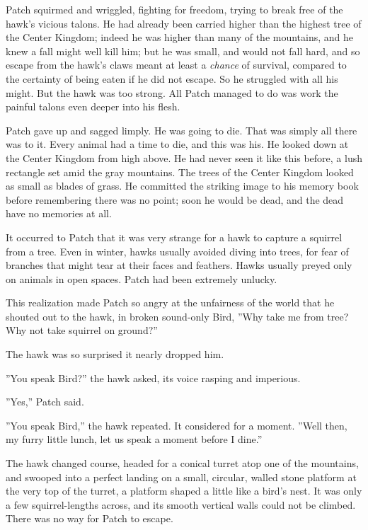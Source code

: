 \documentclass[12pt]{book}
\begin{document}
 Patch squirmed and wriggled, fighting for freedom, trying to break free of the hawk's vicious talons. He had already been carried higher than the highest tree of the Center Kingdom; indeed he was higher than many of the mountains, and he knew a fall might well kill him; but he was small, and would not fall hard, and so escape from the hawk's claws meant at least a {\it chance} of survival, compared to the certainty of being eaten if he did not escape. So he struggled with all his might. But the hawk was too strong. All Patch managed to do was work the painful talons even deeper into his flesh.\par
 Patch gave up and sagged limply. He was going to die. That was simply all there was to it. Every animal had a time to die, and this was his. He looked down at the Center Kingdom from high above. He had never seen it like this before, a lush rectangle set amid the gray mountains. The trees of the Center Kingdom looked as small as blades of grass. He committed the striking image to his memory book before remembering there was no point; soon he would be dead, and the dead have no memories at all.\par
 It occurred to Patch that it was very strange for a hawk to capture a squirrel from a tree. Even in winter, hawks usually avoided diving into trees, for fear of branches that might tear at their faces and feathers. Hawks usually preyed only on animals in open spaces. Patch had been extremely unlucky.\par
This realization made Patch so angry at the unfairness of the world that he shouted out to the hawk, in broken sound-only Bird, ''Why take me from tree? Why not take squirrel on ground?''\par
 The hawk was so surprised it nearly dropped him.\par
''You speak Bird?'' the hawk asked, its voice rasping and imperious.\par
 ''Yes,'' Patch said.\par
 ''You speak Bird,'' the hawk repeated. It considered for a moment. ''Well then, my furry little lunch, let us speak a moment before I dine.''\par
 The hawk changed course, headed for a conical turret atop one of the mountains, and swooped into a perfect landing on a small, circular, walled stone platform at the very top of the turret, a platform shaped a little like a bird's nest. It was only a few squirrel-lengths across, and its smooth vertical walls could not be climbed. There was no way for Patch to escape.\par
\end{document}
